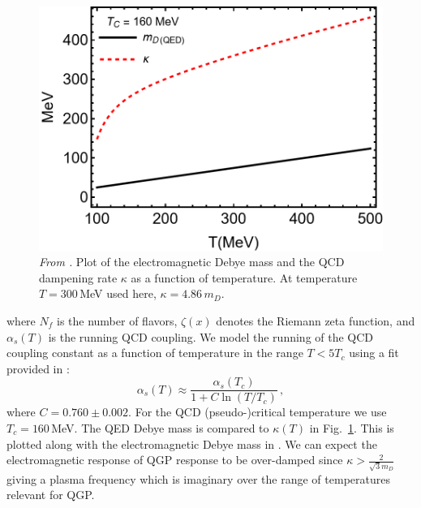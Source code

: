 \begin{figure}[h!]
    \centering
    \includegraphics[width=0.85\linewidth]{plots/chap02QCD/kappaDEBYE.png}
    \caption{\textit{From \cite{Grayson:2022asf}.} Plot of the electromagnetic Debye mass and the QCD dampening rate $\kappa$ as a function of temperature. At temperature $T=300\,$MeV used here, $\kappa = 4.86\, m_D$.\label{fig:kappaDebye}}
\end{figure}

where $N_f$ is the number of flavors, $\zeta(x)$ denotes the Riemann zeta function, and $\alpha_s(T)$ is the running QCD coupling.  We model the running of the QCD coupling constant as a function of temperature in the range $T<5T_c$ using a fit provided in \cite{Letessier:2002ony}:
\begin{equation}\label{eq:alphas}
    \alpha_s(T) \approx \frac{\alpha_s(T_c)}{1+C \ln(T/T_c)}\,,
\end{equation}
where $C=0.760 \pm 0.002$. For the QCD (pseudo-)critical temperature we use $T_c = 160\,$MeV. The QED Debye mass is compared to $\kappa(T)$ in Fig.~\ref{fig:kappaDebye}. 
This is plotted along with the electromagnetic Debye mass in . We can expect the electromagnetic response of QGP response to be over-damped since $\kappa> \frac{2}{\sqrt{3} m_D}$ giving a plasma frequency  which is imaginary over the range of temperatures relevant for QGP.


